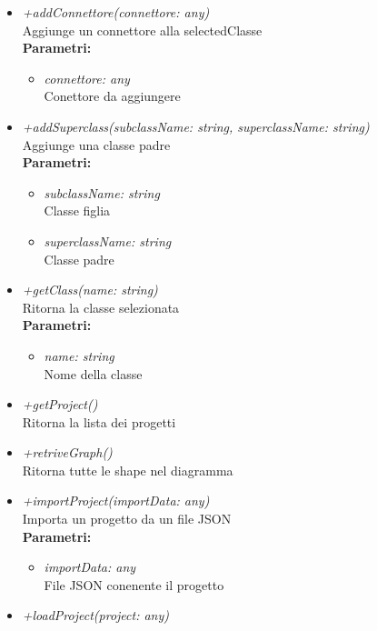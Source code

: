 \begin{itemize}
\begin{itemize}
    		\item \emph{+addConnettore(connettore: any)}\\
    		Aggiunge un connettore alla selectedClasse\\
    		\textbf{Parametri:}
    		\begin{itemize}
    			\item \emph{connettore: any}\\
    			Conettore da aggiungere
    		\end{itemize}
    		\item \emph{+addSuperclass(subclassName: string, superclassName: string)}\\
    		Aggiunge una classe padre\\
    		\textbf{Parametri:}
    		\begin{itemize}
    			\item \emph{subclassName: string}\\
    			Classe figlia
    			\item \emph{superclassName: string}\\
    			Classe padre
    		\end{itemize}
    		\item \emph{+getClass(name: string)}\\
    		Ritorna la classe selezionata\\
    		\textbf{Parametri:}
    		\begin{itemize}
    			\item \emph{name: string}\\
    			Nome della classe
    		\end{itemize}
    		\item \emph{+getProject()}\\
    		Ritorna la lista dei progetti
    		\item \emph{+retriveGraph()}\\
    		Ritorna tutte le shape nel diagramma
    		\item \emph{+importProject(importData: any)}\\
    		Importa un progetto da un file JSON\\
    		\textbf{Parametri:}
    		\begin{itemize}
    			\item \emph{importData: any}\\
    			File JSON conenente il progetto
    		\end{itemize}
    		\item \emph{+loadProject(project: any)}\\

\end{itemize}
\end{itemize}
